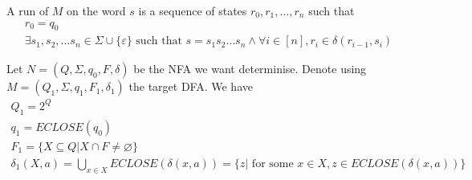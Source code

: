 \documentclass[a4paper]{article}
\theoremstyle{plain}
\theoremstyle{definition}
\newtheorem{defn}{Definition}[section]
\theoremstyle{remark}
\begin{document}
\begin{tcolorbox}[colback=black!3!white,colframe=black!60!white,title=\begin{defn}Run of M \label{Run of M}\end{defn}]
A run of $M$ on the word $s$ is a sequence of states $r_0,r_1,\ldots,r_n$ such that
\begin{align}
r_0=q_0 \\
\exists s_1,s_2,\ldots s_n \in \Sigma \cup \{ \varepsilon \} \text{ such that } s=s_1s_2 \ldots s_n \land \forall i \in [n], r_i \in \delta(r_{i-1},s_i)
\end{align}
\end{tcolorbox}
\begin{tcolorbox}[colback=black!3!white,colframe=black!60!white,title=\begin{defn}Subset Construction \label{Subset Construction}\end{defn}]
Let $N = (Q,\Sigma, q_0,F,\delta)$ be the NFA we want determinise. Denote using $M = (Q_1,\Sigma,q_1,F_1,\delta_1)$ the target DFA. We have
\begin{align}
Q_1=2^{Q} \\
q_1 = ECLOSE(q_0)\\
F_1 = \{X \subseteq Q | X \cap F \neq \varnothing\} \\
\delta_1(X,a) = \bigcup_{x \in X} ECLOSE(\delta(x,a)) = \{ z | \text{ for some } x \in X, z \in ECLOSE(\delta(x,a))\}
\end{align}
\end{tcolorbox}
\end{document}
